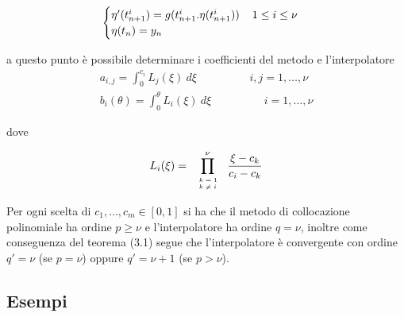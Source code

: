 $$
\begin{cases}
  \eta'(t_{n+1}^i) = g(t_{n+1}^i. \eta(t_{n+1}^i))	\hspace{0.4cm}	1 \le i \le \nu		\\
  \eta(t_n)=y_n
\end{cases}
$$

a questo punto è possibile determinare i coefficienti del metodo e l'interpolatore
$$
\begin{array}{lc}
\displaystyle
 a_{i,j} = \int_0^{c_i}	L_j(\xi) \ d \xi		\hspace{2cm}	i,j = 1, \dots, \nu	\\
\displaystyle
 b_i(\theta) = \int_0^{\theta}	L_i(\xi) \ d \xi	\hspace{2cm}	i=1, \dots, \nu
\end{array}
$$

dove 

$$
L_i( \xi ) = \prod_{\mbox{ \tiny $\begin{array}{lc}  k=1	\\  k \ne i \end{array}$ } }^{\nu}	\frac{\xi - c_k}{c_i - c_k}
$$

\begin{thm}
 Per ogni scelta di $c_1 , \dots , c_m \in [0,1]$ si ha che il metodo di collocazione polinomiale ha ordine $p \geq \nu$ e l'interpolatore ha ordine 
$q=\nu$, inoltre come conseguenza del teorema (3.1) segue che l'interpolatore è convergente con ordine 
$q'= \nu$ (se $p=\nu$) oppure $q'=\nu+1$ (se $p > \nu$).
\end{thm}

\subsection{Esempi}


